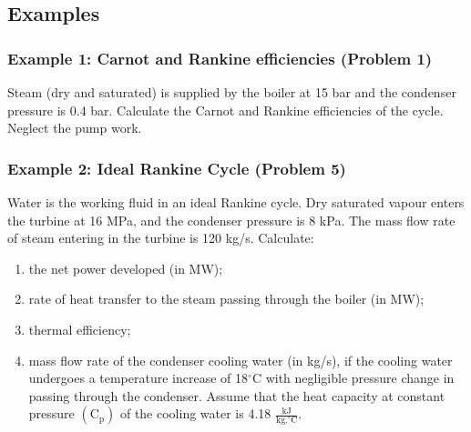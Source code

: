 \documentclass[10pt,compress]{beamer}
\begin{document}
\begin{frame}
\begin{columns}
\begin{column}[c]{0.5\linewidth}
{\begin{figure}
\begin{center}
           \end{center}
         \end{figure}}
      \end{column}
   \end{columns}
 \normalsize
\end{frame}

\subsection{Examples}

\begin{frame}
 \frametitle{Example 1: Carnot and Rankine efficiencies (Problem 1)}
    Steam (dry and saturated) is supplied by the boiler at 15 bar and the condenser pressure is 0.4 bar. Calculate the Carnot and Rankine efficiencies of the cycle. Neglect the pump work.
\end{frame}

\begin{frame}
 \frametitle{Example 2: Ideal Rankine Cycle (Problem 5)}
Water is the working fluid in an ideal Rankine cycle. Dry saturated vapour enters the turbine at 16 MPa, and the condenser pressure is 8 kPa. The mass flow rate of steam entering in the turbine is 120 kg/s. Calculate:
\begin{enumerate}
\item the net power developed (in MW);
\item rate of heat transfer to the steam passing through the boiler (in MW);
\item thermal efficiency;
\item mass flow rate of the condenser cooling water (in kg/s), if the cooling water undergoes a temperature increase of 18$^{\circ}$C with negligible pressure change in passing through the condenser. Assume that the heat capacity at constant pressure $\left(\text{C}_{\text{p}}\right)$ of the cooling water is 4.18 $\frac{\text{kJ}}{\text{kg.}^{\circ}\text{C}}$.
\end{enumerate} 
\end{frame}
\end{document}
